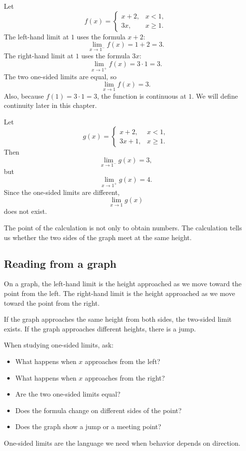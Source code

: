\begin{examplebox}
Let
\[
f(x)=
\begin{cases}
x+2, & x<1,\\
3x, & x\ge1.
\end{cases}
\]
The left-hand limit at \(1\) uses the formula \(x+2\):
\[
\lim_{x\to1^-}f(x)=1+2=3.
\]
The right-hand limit at \(1\) uses the formula \(3x\):
\[
\lim_{x\to1^+}f(x)=3\cdot1=3.
\]
The two one-sided limits are equal, so
\[
\lim_{x\to1}f(x)=3.
\]
Also, because \(f(1)=3\cdot1=3\), the function is continuous at \(1\). We will define continuity later in this chapter.
\end{examplebox}

\begin{examplebox}
Let
\[
g(x)=
\begin{cases}
x+2, & x<1,\\
3x+1, & x\ge1.
\end{cases}
\]
Then
\[
\lim_{x\to1^-}g(x)=3,
\]
but
\[
\lim_{x\to1^+}g(x)=4.
\]
Since the one-sided limits are different,
\[
\lim_{x\to1}g(x)
\]
does not exist.
\end{examplebox}

The point of the calculation is not only to obtain numbers. The calculation tells us whether the two sides of the graph meet at the same height.

\subsection*{Reading from a graph}

On a graph, the left-hand limit is the height approached as we move toward the point from the left. The right-hand limit is the height approached as we move toward the point from the right.

If the graph approaches the same height from both sides, the two-sided limit exists. If the graph approaches different heights, there is a jump.

\begin{summarybox}
When studying one-sided limits, ask:
\begin{itemize}
\item What happens when \(x\) approaches from the left?
\item What happens when \(x\) approaches from the right?
\item Are the two one-sided limits equal?
\item Does the formula change on different sides of the point?
\item Does the graph show a jump or a meeting point?
\end{itemize}
\end{summarybox}

One-sided limits are the language we need when behavior depends on direction.
